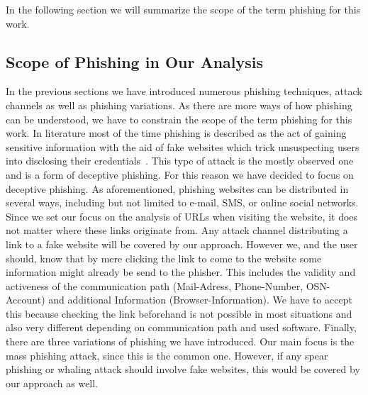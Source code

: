  In the following section we will summarize the scope of the term phishing for this work.
\subsection{Scope of Phishing in Our Analysis}
\label{s:scope}
In the previous sections we have introduced numerous phishing techniques, attack channels as well as phishing variations. As there are more ways of how phishing can be understood, we have to constrain the scope of the term phishing for this work. In literature most of the time phishing is described as the act of gaining sensitive information with the aid of fake websites which trick unsuspecting users into disclosing their credentials~\cite{sheng2007antiphishingphil, antiphishingtrendreport2013, kasperskyreport2013}.
This type of attack is the mostly observed one and is a form of deceptive phishing. For this reason we have decided to focus on deceptive phishing. As aforementioned, phishing websites can be distributed in several ways, including but not limited to e-mail, SMS, or online social networks. Since we set our focus on the analysis of URLs when visiting the website, it does not matter where these links originate from. Any attack channel distributing a link to a fake website will be covered by our approach. However we, and the user should, know that by mere clicking the link to come to the website some information might already be send to the phisher. This includes the validity and activeness of the communication path (Mail-Adress, Phone-Number, OSN-Account) and additional Information (Browser-Information). We have to accept this because checking the link beforehand is not possible in most situations and also very different depending on communication path and used software.  Finally, there are three variations of phishing we have introduced. Our main focus is the mass phishing attack, since this is the common one. However, if any spear phishing or whaling attack should involve fake websites, this would be covered by our approach as well.

